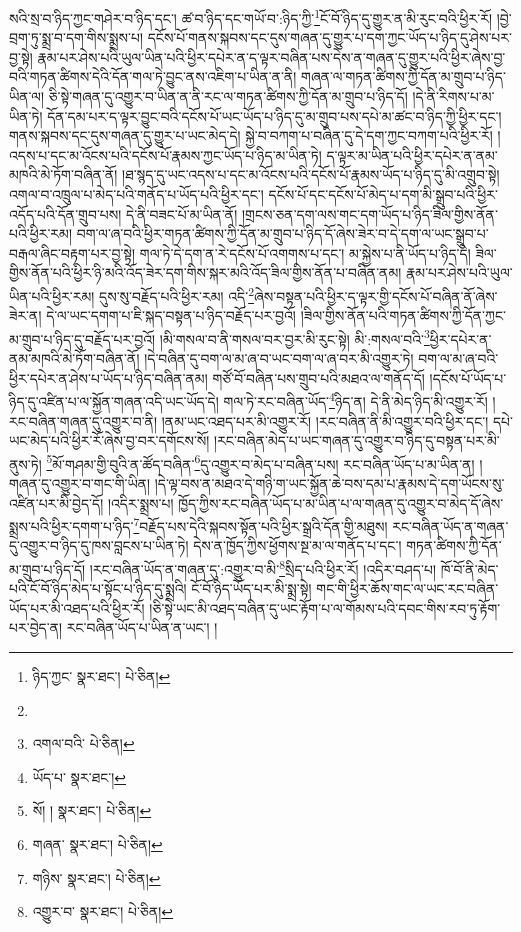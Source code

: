 སའི་སྲ་བ་ཉིད་ཀྱང་གཤེར་བ་ཉིད་དང་། ཚ་བ་ཉིད་དང་གཡོ་བ་:ཉིད་ཀྱི་\footnote{ཉིད་ཀྱང་  སྣར་ཐང་།  པེ་ཅིན། }ངོ་བོ་ཉིད་དུ་གྱུར་ན་མི་རུང་བའི་ཕྱིར་རོ། །བྱེ་བྲག་ཏུ་སྨྲ་བ་དག་གིས་སྨྲས་པ། དངོས་པོ་གནས་སྐབས་དང་དུས་གཞན་དུ་གྱུར་པ་དག་ཀྱང་ཡོད་པ་ཉིད་དུ་ཤེས་པར་བྱ་སྟེ། རྣམ་པར་ཤེས་པའི་ཡུལ་ཡིན་པའི་ཕྱིར་དཔེར་ན་ད་ལྟར་བཞིན་པས་དེས་ན་གཞན་དུ་གྱུར་པའི་ཕྱིར་ཞེས་བྱ་བའི་གཏན་ཚིགས་དེའི་དོན་གལ་ཏེ་བྱུང་ནས་འཇིག་པ་ཡིན་ན་ནི། གཞན་ལ་གཏན་ཚིགས་ཀྱི་དོན་མ་གྲུབ་པ་ཉིད་ཡིན་ལ། ཅི་སྟེ་གཞན་དུ་འགྱུར་བ་ཡིན་ན་ནི་རང་ལ་གཏན་ཚིགས་ཀྱི་དོན་མ་གྲུབ་པ་ཉིད་དོ། །དེ་ནི་རིགས་པ་མ་ཡིན་ཏེ། དོན་དམ་པར་ད་ལྟར་བྱུང་བའི་དངོས་པོ་ཡང་ཡོད་པ་ཉིད་དུ་མ་གྲུབ་པས་དཔེ་མ་ཚང་བ་ཉིད་ཀྱི་ཕྱིར་དང་། གནས་སྐབས་དང་དུས་གཞན་དུ་གྱུར་པ་ཡང་མེད་དེ། སྐྱེ་བ་བཀག་པ་བཞིན་དུ་དེ་དག་ཀྱང་བཀག་པའི་ཕྱིར་རོ། །འདས་པ་དང་མ་འོངས་པའི་དངོས་པོ་རྣམས་ཀྱང་ཡོད་པ་ཉིད་མ་ཡིན་ཏེ། ད་ལྟར་མ་ཡིན་པའི་ཕྱིར་དཔེར་ན་ནམ་མཁའི་མེ་ཏོག་བཞིན་ནོ། །ཐ་སྙད་དུ་ཡང་འདས་པ་དང་མ་འོངས་པའི་དངོས་པོ་རྣམས་ཡོད་པ་ཉིད་དུ་མི་འགྲུབ་སྟེ། འགལ་བ་འཁྲུལ་པ་མེད་པའི་གནོད་པ་ཡོད་པའི་ཕྱིར་དང་། དངོས་པོ་དང་དངོས་པོ་མེད་པ་དག་མི་སྒྲུབ་པའི་ཕྱིར་འདོད་པའི་དོན་གྲུབ་པས། དེ་ནི་བཟང་པོ་མ་ཡིན་ནོ། །གྲངས་ཅན་དག་ལས་གང་དག་ཡོད་པ་ཉིད་ཟིལ་གྱིས་ནོན་པའི་ཕྱིར་རམ། བག་ལ་ཞ་བའི་ཕྱིར་གཏན་ཚིགས་ཀྱི་དོན་མ་གྲུབ་པ་ཉིད་དོ་ཞེས་ཟེར་བ་དེ་དག་ལ་ཡང་སྒྲུབ་པ་བརྒལ་ཞིང་བརྟག་པར་བྱ་སྟེ། གལ་ཏེ་དེ་དག་ན་རེ་དངོས་པོ་འགགས་པ་དང་། མ་སྐྱེས་པ་ནི་ཡོད་པ་ཉིད་དེ། ཟིལ་གྱིས་ནོན་པའི་ཕྱིར་ཉི་མའི་འོད་ཟེར་དག་གིས་སྐར་མའི་འོད་ཟིལ་གྱིས་ནོན་པ་བཞིན་ནམ། རྣམ་པར་ཤེས་པའི་ཡུལ་ཡིན་པའི་ཕྱིར་རམ། དུས་སུ་བརྗོད་པའི་ཕྱིར་རམ། འདི་\footnote{}ཞེས་བསྟན་པའི་ཕྱིར་ད་ལྟར་གྱི་དངོས་པོ་བཞིན་ནོ་ཞེས་ཟེར་ན། དེ་ལ་ཡང་དགག་པ་ཇི་སྐད་བསྟན་པ་ཉིད་བརྗོད་པར་བྱའོ། །ཟིལ་གྱིས་ནོན་པའི་གཏན་ཚིགས་ཀྱི་དོན་ཀྱང་མ་གྲུབ་པ་ཉིད་དུ་བརྗོད་པར་བྱའོ། །མི་གསལ་བ་ནི་གསལ་བར་བྱར་མི་རུང་སྟེ། མི་:གསལ་བའི་\footnote{འགལ་བའི་  པེ་ཅིན། }ཕྱིར་དཔེར་ན་ནམ་མཁའི་མེ་ཏོག་བཞིན་ནོ། །དེ་བཞིན་དུ་བག་ལ་མ་ཞ་བ་ཡང་བག་ལ་ཞ་བར་མི་འགྱུར་ཏེ། བག་ལ་མ་ཞ་བའི་ཕྱིར་དཔེར་ན་ཤེས་པ་ཡོད་པ་ཉིད་བཞིན་ནམ། གཙོ་བོ་བཞིན་པས་གྲུབ་པའི་མཐའ་ལ་གནོད་དོ། །དངོས་པོ་ཡོད་པ་ཉིད་དུ་འཛིན་པ་ལ་སྐྱོན་གཞན་འདི་ཡང་ཡོད་དེ། གལ་ཏེ་རང་བཞིན་ཡོད་\footnote{ཡོད་པ་  སྣར་ཐང་། }ཉིད་ན། དེ་ནི་མེད་ཉིད་མི་འགྱུར་རོ། །རང་བཞིན་གཞན་དུ་འགྱུར་བ་ནི། །ནམ་ཡང་འཐད་པར་མི་འགྱུར་རོ། །རང་བཞིན་ནི་མི་འགྱུར་བའི་ཕྱིར་དང་། དཔེ་ཡང་མེད་པའི་ཕྱིར་རོ་ཞེས་བྱ་བར་དགོངས་སོ། །རང་བཞིན་མེད་པ་ཡང་གཞན་དུ་འགྱུར་བ་ཉིད་དུ་བསྟན་པར་མི་ནུས་ཏེ། \footnote{སོ། །   སྣར་ཐང་།  པེ་ཅིན། }མོ་གཤམ་གྱི་བུའི་ན་ཚོད་བཞིན་\footnote{གཞན་  སྣར་ཐང་།  པེ་ཅིན། }དུ་འགྱུར་བ་མེད་པ་བཞིན་པས། རང་བཞིན་ཡོད་པ་མ་ཡིན་ན། །གཞན་དུ་འགྱུར་བ་གང་གི་ཡིན། །དེ་ལྟ་བས་ན་མཐའ་དེ་གཉི་ག་ཡང་སྐྱོན་ཆེ་བས་དམ་པ་རྣམས་དེ་དག་ཡོངས་སུ་འཛིན་པར་མི་བྱེད་དོ། །འདིར་སྨྲས་པ། ཁྱོད་ཀྱིས་རང་བཞིན་ཡོད་པ་མ་ཡིན་པ་ལ་གཞན་དུ་འགྱུར་བ་མེད་དོ་ཞེས་སྨྲས་པའི་ཕྱིར་དགག་པ་ཉིད་\footnote{གཉིས་  སྣར་ཐང་།  པེ་ཅིན། }བརྗོད་པས་དེའི་སྐབས་སྟོན་པའི་ཕྱིར་སྒྲའི་དོན་གྱི་མཐུས། རང་བཞིན་ཡོད་ན་གཞན་དུ་འགྱུར་བ་ཉིད་དུ་ཁས་བླངས་པ་ཡིན་ཏེ། དེས་ན་ཁྱོད་ཀྱིས་ཕྱོགས་སྔ་མ་ལ་གནོད་པ་དང་། གཏན་ཚིགས་ཀྱི་དོན་མ་གྲུབ་པ་ཉིད་དོ། །རང་བཞིན་ཡོད་ན་གཞན་དུ་:འགྱུར་བ་མི་\footnote{འགྱུར་བ་  སྣར་ཐང་།  པེ་ཅིན། }སྲིད་པའི་ཕྱིར་རོ། །འདིར་བཤད་པ། ཁོ་བོ་ནི་མེད་པའི་ངོ་བོ་ཉིད་མེད་པ་སྟོང་པ་ཉིད་དུ་སྨྲའི། ངོ་བོ་ཉིད་ཡོད་པར་མི་སྨྲ་སྟེ། གང་གི་ཕྱིར་ཆོས་གང་ལ་ཡང་རང་བཞིན་ཡོད་པར་མི་འཐད་པའི་ཕྱིར་རོ། །ཅི་སྟེ་ཡང་མི་འཐད་བཞིན་དུ་ཡང་རྟོག་པ་ལ་གོམས་པའི་དབང་གིས་རབ་ཏུ་རྟོག་པར་བྱེད་ན། རང་བཞིན་ཡོད་པ་ཡིན་ན་ཡང་། །
